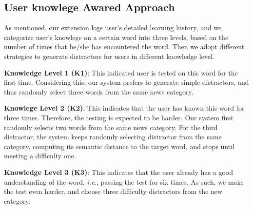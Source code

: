 \subsection{User knowlege Awared Approach}
As mentioned, our extension logs user's detailed learning history, and we categorize user's knowlege  on a certain word into three levels, based on the number of times that he/she has encountered  the word.  Then we adopt different strategies to generate  distractors for users in different knowledge level. 


{\bf Knowledge Level 1 (K1)}: This indicated user is tested on this word for the first time. Considering this, our system prefers to generate simple distractors, and thus randomly select three words from the same news category. 

{\bf Knowlege Level 2 (K2)}: This indicates that the user has known this word for three times. Therefore, the testing is expected to be harder. Our system first randomly selects two words from the same news category. For the third distractor,  the system keeps randomly selecting distractor from the same category, computing its semantic distance to the target word, and stops until meeting a difficulty one.


{\bf Knowledge Level 3 (K3)}: This indicates that the user already has a good understanding of the word, {\it i.e.}, passing the test for six times. As such, we make the test even harder, and choose  three difficulty distractors from the new category. 




